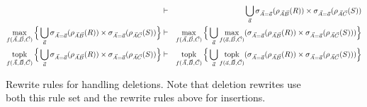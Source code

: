 \begin{figure*}
\begin{eqnarray}
& \vdash &
\bigcup_{\vec{a}}
\sigma_{\vec{A}=\vec{a}}(\rho_{\vec{A}\vec{B}}(R))
\times \sigma_{\vec{A}=\vec{a}}(\rho_{\vec{A}\vec{C}}(S))
\label{r23}
\\
\max_{f(\vec{A},\vec{B},\vec{C})} \Big\{
\bigcup_{\vec{a}}
\sigma_{\vec{A}=\vec{a}}(\rho_{\vec{A}\vec{B}}(R)) \times
\sigma_{\vec{A}=\vec{a}}(\rho_{\vec{A}\vec{C}}(S)) \Big\}
& \vdash &
\max_{f(\vec{A},\vec{B},\vec{C})}\Big\{
\bigcup_{\vec{a}} \max_{f(\vec{a},\vec{B},\vec{C})}
(\sigma_{\vec{A}=\vec{a}}(\rho_{\vec{A}\vec{B}}(R)) \times
\sigma_{\vec{A}=\vec{a}}(\rho_{\vec{A}\vec{C}}(S))) 
\Big\}
\label{r24}
\\
\mathop{\mathrm{topk}}_{f(\vec{A},\vec{B},\vec{C})} \Big\{
\bigcup_{\vec{a}}
\sigma_{\vec{A}=\vec{a}}(\rho_{\vec{A}\vec{B}}(R)) \times
\sigma_{\vec{A}=\vec{a}}(\rho_{\vec{A}\vec{C}}(S)) \Big\}
& \vdash &
\mathop{\mathrm{topk}}_{f(\vec{A},\vec{B},\vec{C})}\Big\{
\bigcup_{\vec{a}} \mathop{\mathrm{topk}}_{f(\vec{a},\vec{B},\vec{C})}
(\sigma_{\vec{A}=\vec{a}}(\rho_{\vec{A}\vec{B}}(R)) \times
\sigma_{\vec{A}=\vec{a}}(\rho_{\vec{A}\vec{C}}(S))) 
\Big\}
\label{r25}
\end{eqnarray}
\caption{Rewrite rules for handling deletions. Note that deletion rewrites use
both this rule set and the rewrite rules above for insertions.}
\label{fig:deleterules}
\end{figure*}


